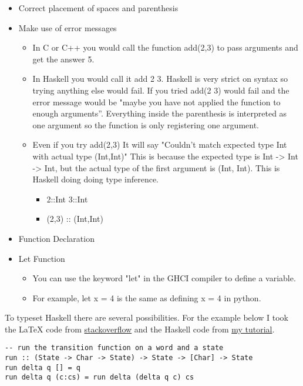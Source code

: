 \documentclass{article}
\begin{document}
\begin{itemize}
\begin{itemize}
  \end{itemize}
  \item Correct placement of spaces and parenthesis
  \item Make use of error messages
    \begin{itemize}
      \item In C or C++ you would call the function add(2,3) to pass arguments and get the answer 5.
      \item In Haskell you would call it add 2 3. Haskell is very strict on syntax so trying anything else would fail. If you tried add(2 3) would fail and the error message would be "maybe you have not applied the function to enough arguments”. Everything inside the parenthesis is interpreted as one argument so the function is only registering one argument.
      \item Even if you try add(2,3) It will say "Couldn't match expected type Int with actual type (Int,Int)" This is because the expected type is Int -> Int -> Int, but the actual type of the first argument is (Int, Int). This is Haskell doing doing type inference.
      \begin{itemize}
          \item 2::Int 3::Int
          \item (2,3) :: (Int,Int)
      \end{itemize}
    \end{itemize}
  \item Function Declaration
  \item Let Function
  \begin{itemize}
      \item You can use the keyword "let" in the GHCI compiler to define a variable.
      \item For example, let x = 4 is the same as defining x = 4 in python.


  \end{itemize}
\end{itemize}



\medskip\noindent
To typeset Haskell there are several possibilities. For the example below I took the LaTeX code from \href{https://stackoverflow.com/a/3175141/4600290}{stackoverflow} and the Haskell code from \href{https://hackmd.io/@alexhkurz/HylLKujCP}{my tutorial}.

\begin{lstlisting}
-- run the transition function on a word and a state
run :: (State -> Char -> State) -> State -> [Char] -> State
run delta q [] = q
run delta q (c:cs) = run delta (delta q c) cs
\end{lstlisting}
\end{document}
